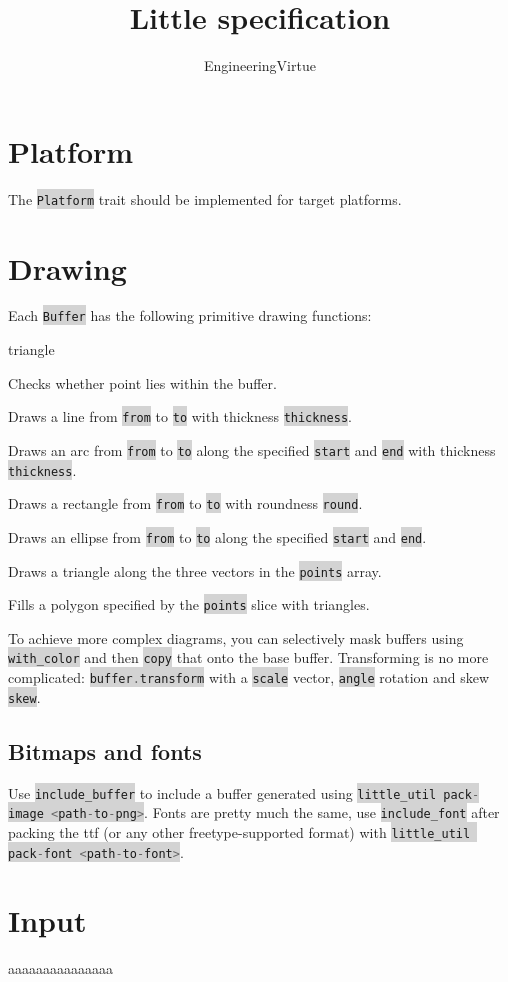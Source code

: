 \documentclass[14pt]{article}
\title{Little specification}
\author{EngineeringVirtue}
\newcommand{\inlinecodelang}[2]{\colorbox{lightgray}{\lstinline[language=#1]$#2$}}
\newcommand{\inliners}[1]{\inlinecodelang{Rust}{#1}}
\begin{document}
\maketitle

\tableofcontents

\newpage

\section{Platform}

The \inliners{Platform} trait should be implemented for target platforms.

\section{Drawing}

Each \inliners{Buffer} has the following primitive drawing functions:

\begin{labeling}{triangle}
	\item[bounded] Checks whether point lies within the buffer.
	\item[line] Draws a line from \inliners{from} to \inliners{to} with thickness \inliners{thickness}.
	\item[arc] Draws an arc from \inliners{from} to \inliners{to} along the specified \inliners{start} and \inliners{end} with thickness \inliners {thickness}.
	\item[rect] Draws a rectangle from \inliners{from} to \inliners{to} with roundness \inliners{round}.
	\item[ellipse] Draws an ellipse from \inliners{from} to \inliners{to} along the specified \inliners{start} and \inliners{end}.
	\item[triangle] Draws a triangle along the three vectors in the \inliners{points} array.
	\item[poly] Fills a polygon specified by the \inliners{points} slice with triangles.
\end{labeling}

To achieve more complex diagrams, you can selectively mask buffers using \inliners{with_color} and then \inliners{copy} that onto the base buffer. Transforming is no more complicated: \inliners{buffer.transform} with a \inliners{scale} vector, \inliners{angle} rotation and skew \inliners{skew}.

\subsection{Bitmaps and fonts}

Use \inliners{include_buffer} to include a buffer generated using \inliners{little_util pack-image <path-to-png>}. Fonts are pretty much the same, use \inliners{include_font} after packing the ttf (or any other freetype-supported format) with \inliners{little_util pack-font <path-to-font>}.

\section{Input}

aaaaaaaaaaaaaaa
\end{document}
